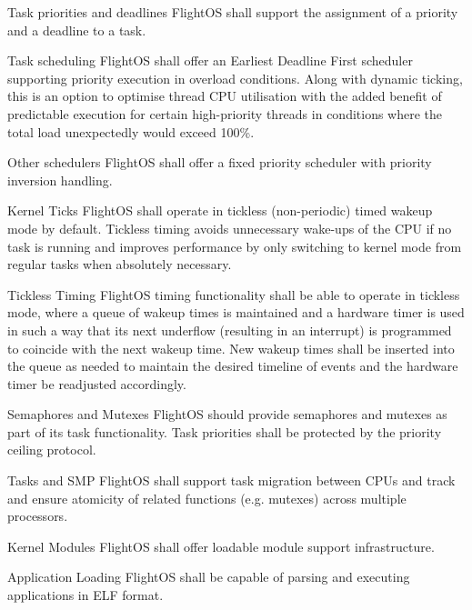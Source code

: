  {Task priorities and deadlines}{%
FlightOS shall support the assignment of a priority and a deadline to a task.
}{}%

 {Task scheduling}{%
FlightOS shall offer an Earliest Deadline First scheduler supporting priority
execution in overload conditions.
}{%
Along with dynamic ticking, this is an option to optimise thread CPU utilisation
with the added benefit of predictable execution for certain high-priority
threads in conditions where the total load unexpectedly would exceed 100\%.
}%

 {Other schedulers}{%
FlightOS shall offer a fixed priority scheduler with priority inversion handling.
}{}%

 {Kernel Ticks}{%
FlightOS shall operate in tickless (non-periodic) timed wakeup mode by default.
}{%
Tickless timing avoids unnecessary wake-ups of the CPU if no task is running
and improves performance by only switching to kernel mode from regular tasks
when absolutely necessary.
}%

 {Tickless Timing}{%
FlightOS timing functionality shall be able to operate in tickless mode, where 
a queue of wakeup times is maintained and a hardware timer is used in such a way
that its next underflow (resulting in an interrupt) is programmed to coincide
with the next wakeup time. New wakeup times shall be inserted into the queue as
needed to maintain the desired timeline of events and the hardware timer
be readjusted accordingly.
}{}%

 {Semaphores and Mutexes}{%
FlightOS should provide semaphores and mutexes as part of its task functionality.
Task priorities shall be protected by the priority ceiling protocol.
}{}%

 {Tasks and \gls{SMP}}{%
FlightOS shall support task migration between \glspl{CPU} and track and ensure
atomicity of related functions (e.g. mutexes) across multiple processors.
}{}%

%

 {Kernel Modules}{%
FlightOS shall offer loadable module support infrastructure.
}{}%

 {Application Loading}{%
FlightOS shall be capable of parsing and executing applications in ELF format.
}{}%

